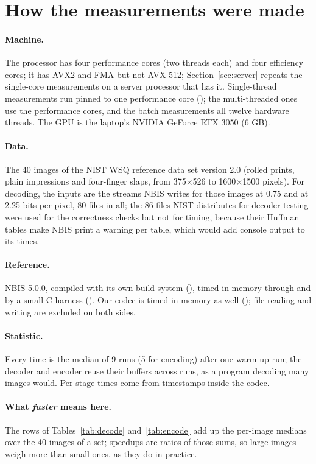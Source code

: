 \section{How the measurements were made}
\label{sec:method}

\paragraph*{Machine.}  The processor has four performance cores
(two threads each) and four efficiency cores; it has AVX2 and FMA but not AVX-512;
Section~\ref{sec:server} repeats the single-core measurements on a server processor that has it.
Single-thread measurements run pinned to one performance core (); the
multi-threaded ones use the performance cores, and the batch measurements all twelve hardware
threads. The GPU is the laptop's NVIDIA GeForce RTX 3050 (6 GB).

\paragraph*{Data.} The 40 images of the NIST WSQ reference data set version 2.0 (rolled prints,
plain impressions and four-finger slaps, from 375$\times$526 to 1600$\times$1500 pixels). For
decoding, the inputs are the streams NBIS writes for those images at 0.75 and at 2.25 bits per
pixel, 80 files in all; the 86 files NIST distributes for decoder testing were used for the
correctness checks but not for timing, because their Huffman tables make NBIS print a warning
per table, which would add console output to its times.

\paragraph*{Reference.} NBIS 5.0.0, compiled with its own build system (), timed
in memory through  and  by a small C harness
(). Our codec is timed in memory as well (); file reading and
writing are excluded on both sides.

\paragraph*{Statistic.} Every time is the median of 9 runs (5 for encoding) after one warm-up
run; the decoder and encoder reuse their buffers across runs, as a program decoding many images
would. Per-stage times come from timestamps inside the codec.

\paragraph*{What \emph{faster} means here.} The rows of Tables~\ref{tab:decode}
and~\ref{tab:encode} add up the per-image medians over the 40 images of a set; speedups are
ratios of those sums, so large images weigh more than small ones, as they do in practice.
